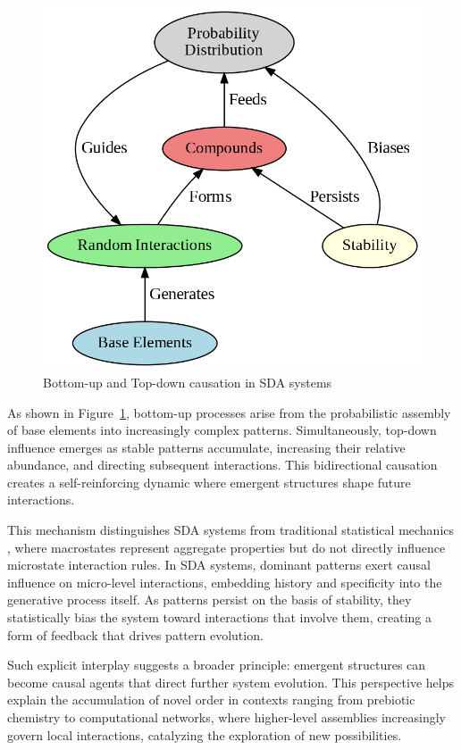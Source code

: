 \documentclass[preprint,12pt]{elsarticle}
\begin{document}
\begin{figure}[h]
    \centering
    \includegraphics[width=0.7\linewidth,height=0.7\linewidth]{figure_10.png}
    \caption{Bottom-up and Top-down causation in SDA systems}
    \label{fig:figure_10}
\end{figure}

As shown in Figure~\ref{fig:figure_10}, bottom-up processes arise from the probabilistic assembly of base elements into increasingly complex patterns. Simultaneously, top-down influence emerges as stable patterns accumulate, increasing their relative abundance, and directing subsequent interactions. This bidirectional causation creates a self-reinforcing dynamic where emergent structures shape future interactions.

This mechanism distinguishes SDA systems from traditional statistical mechanics \cite{landau1980statistical}, where macrostates represent aggregate properties but do not directly influence microstate interaction rules. In SDA systems, dominant patterns exert causal influence on micro-level interactions, embedding history and specificity into the generative process itself. As patterns persist on the basis of stability, they statistically bias the system toward interactions that involve them, creating a form of feedback that drives pattern evolution.

Such explicit interplay suggests a broader principle: emergent structures can become causal agents that direct further system evolution. This perspective helps explain the accumulation of novel order in contexts ranging from prebiotic chemistry to computational networks, where higher-level assemblies increasingly govern local interactions, catalyzing the exploration of new possibilities.
\end{document}
